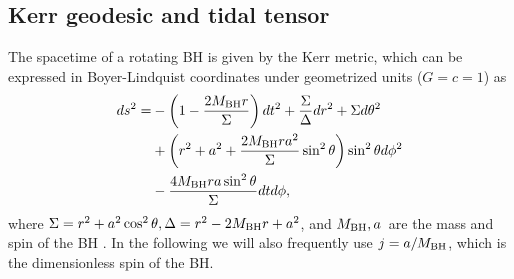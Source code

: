 \documentclass[useAMS,usenatbib]{mn2e}
\def\mBH{M_{\rm BH}}
\newcommand{\lrb}[1]{\left({#1}\right)}
\begin{document}
\subsection{Kerr geodesic and tidal tensor}\label{sec:Kerr_basic}
The spacetime of a rotating BH is given by the Kerr metric, which can be expressed in Boyer-Lindquist coordinates under geometrized units ($G=c=1$) as
\begin{equation}
\begin{split}
        ds^{2} =& -\lrb{1-\frac{2\mBH r}{\Sigma}}dt^{2}+\frac{\Sigma}{\Delta}dr^{2}+\Sigma d\theta^{2} \\
        & +\lrb{r^{2}+a^{2}+\frac{2\mBH ra^{2}}{\Sigma}\sin^{2}\theta}\sin^{2}\theta d\phi^{2} \\
        & -\frac{4\mBH ra\sin^{2}\theta}{\Sigma}dtd\phi,
\end{split}
\label{eq:BL_coor}
\end{equation}
where $\Sigma=r^2+a^2\cos^2\theta,\Delta=r^2-2\mBH r+a^2$, and $\mBH,a$\ are the mass and spin of the BH \citep{Boyer1967}.
In the following we will also frequently use $j=a/\mBH$, which is the dimensionless spin of the BH.
\end{document}
